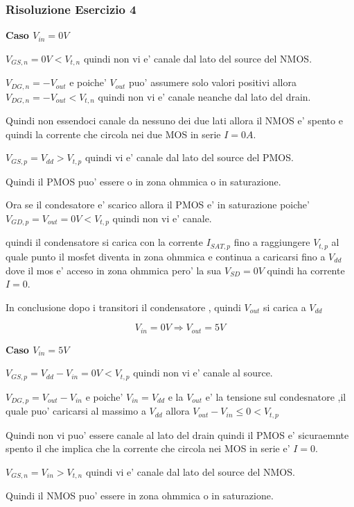 \documentclass[\main/main.tex]{subfiles}
\begin{document}
\clearpage
\subsubsection{Risoluzione Esercizio 4}

\textbf{Caso $V_{in} = 0V$}

$V_{GS,n} = 0V < V_{t,n}$ quindi non vi e' canale dal lato del source del NMOS.

$V_{DG,n} = -V_{out} $ e poiche' $V_{out}$ puo' assumere solo valori positivi allora $V_{DG,n} = -V_{out} < V_{t,n}$ quindi non vi e' canale neanche dal lato del drain.

Quindi non essendoci canale da nessuno dei due lati allora il NMOS e' spento e quindi la corrente che circola nei due MOS in serie $I = 0A$.


$V_{GS,p} = V_{dd} > V_{t,p}$ quindi vi e' canale dal lato del source del PMOS.

Quindi il PMOS puo' essere o in zona ohmmica o in saturazione.

Ora se il condesatore e' scarico allora il PMOS e' in saturazione poiche' $V_{GD,p} = V_{out} = 0V < V_{t,p}$ quindi non vi e' canale.

quindi il condensatore si carica con la corrente $I_{SAT,p}$ fino a raggiungere $V_{t,p}$ al quale punto il mosfet diventa in zona ohmmica
e continua a caricarsi fino a $V_{dd}$ dove il mos e' acceso in zona ohmmica pero' la sua $V_{SD} = 0V$ quindi ha corrente $I = 0$.

In conclusione dopo i transitori il condensatore , quindi $V_{out}$ si carica a $V_{dd}$

\[V_{in} = 0V \Rightarrow V_{out} = 5V\]



\textbf{Caso $V_{in} = 5V$}

$V_{GS,p} = V_{dd} - V_{in} = 0V < V_{t,p}$ quindi non vi e' canale al source.

$V_{DG,p} = V_{out} - V_{in}$ e poiche' $V_{in} = V_{dd}$ e la $V_{out}$ e' la tensione sul condesnatore ,il quale puo' caricarsi al massimo a $V_{dd}$ allora $V_{out} - V_{in} \le 0 < V_{t,p}$

Quindi non vi puo' essere canale al lato del drain  quindi il PMOS e' sicuraemnte spento il che implica che la corrente che circola nei MOS in serie e' $I = 0$.

$V_{GS,n} = V_{in} > V_{t,n}$ quindi vi e' canale dal lato del source del NMOS.

Quindi il NMOS puo' essere in zona ohmmica o in saturazione.
\end{document}
